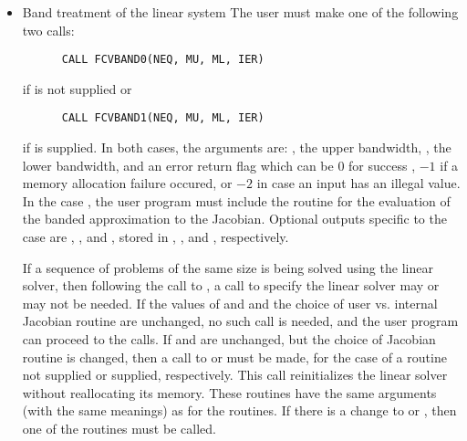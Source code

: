 \begin{enumerate}
\begin{itemize}
  \item {\s}
    Band treatment of the linear system
    The user must make one of the following two calls:
\begin{verbatim}
      CALL FCVBAND0(NEQ, MU, ML, IER)
\end{verbatim}
    if  is not supplied or
\begin{verbatim}
      CALL FCVBAND1(NEQ, MU, ML, IER)
\end{verbatim}
    if  is supplied.
    In both cases, the arguments are: , the upper bandwidth, , 
    the lower bandwidth, and  an error return flag which can be  
    $0$ for success , $-1$ if a memory allocation failure occured, or $-2$ 
    in case an input has an illegal value.     
    In the case , the user program must include the  routine 
    for the evaluation of the banded approximation to the Jacobian.
    Optional outputs specific to the {\band} case are , , and ,
    stored in , , and , respectively.
    
    If a sequence of problems of the same size is being solved using the
    {\band} linear solver, then following the call to , a call to specify
    the linear solver may or may not be needed.  If the values of  and  and
    the choice of user vs. internal Jacobian routine are unchanged, no such call is
    needed, and the user program can proceed to the  calls.  If  
    and  are unchanged, but the choice of Jacobian routine is changed, 
    then a call to  or  must be made, 
    for the case of a  routine not supplied or supplied, respectively.  
    This call reinitializes the {\band} linear solver without reallocating its memory.  
    These routines have the same arguments (with the same meanings) as for the 
     routines.  If there is a change to  or , 
    then one of the  routines must be called.


\end{itemize}
\end{enumerate}
